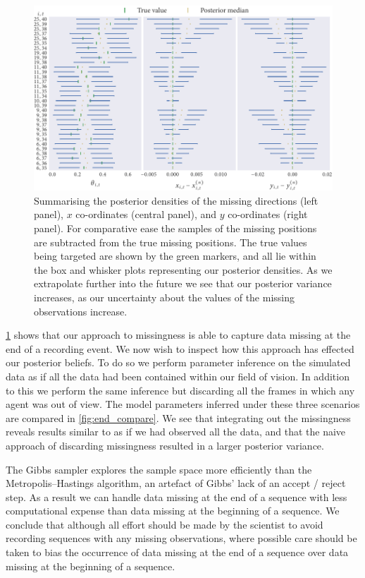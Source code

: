 \begin{figure}[tbp]
  \includegraphics{end/summary.pdf}
  \caption{Summarising the posterior densities of the missing directions (left
  panel), $x$ co-ordinates (central panel), and $y$ co-ordinates (right
  panel). For comparative ease the samples of the missing positions are
  subtracted from the true missing positions. The true values being
  targeted are shown by the green markers, and all lie within the box and
  whisker plots representing our posterior densities. As we extrapolate further
  into the future we see that our posterior variance increases, as our
  uncertainty about the values of the missing observations increase.}
  \label{fig:end_summary}
\end{figure}

\cref{fig:end_summary} shows that our approach to missingness is able to
capture data missing at the end of a recording event. We now wish to inspect
how this approach has effected our posterior beliefs. To do so we perform
parameter inference on the simulated data as if all the data had been contained
within our field of vision. In addition to this we perform the same inference
but discarding all the frames in which any agent was out of view. The model
parameters inferred under these three scenarios are compared in
\cref{fig:end_compare}. We see that integrating out the missingness reveals
results similar to as if we had observed all the data, and that the naive
approach of discarding missingness resulted in a larger posterior variance.

The Gibbs sampler explores the sample space more efficiently than the
Metropolis--Hastings algorithm, an artefact of Gibbs' lack of an accept / reject
step. As a result we can handle data missing at the end of a sequence with
less computational expense than data missing at the beginning of a sequence.
We conclude that although all effort should be made by the scientist to avoid
recording sequences with any missing observations, where possible care should
be taken to bias the occurrence of data missing at the end of a sequence over
data missing at the beginning of a sequence.

